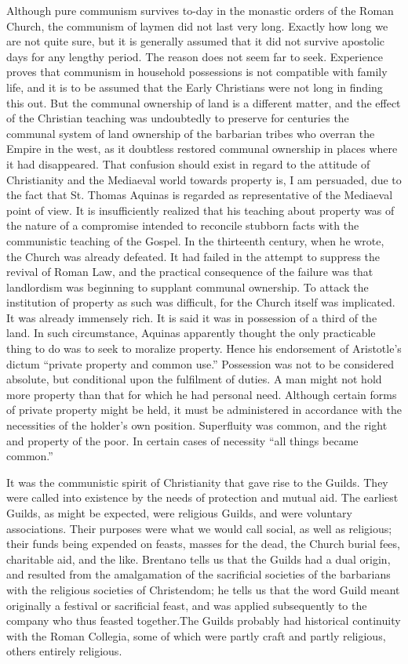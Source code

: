 \documentclass{book}
\begin{document}
Although pure communism survives to-day in the monastic orders of the Roman Church, the communism of laymen did not last very long. Exactly how long we are not quite sure, but it is generally assumed that it did not survive apostolic days for any lengthy period. The reason does not seem far to seek. Experience proves that communism in household possessions is not compatible with family life, and it is to be assumed that the Early Christians were not long in finding this out. But the communal ownership of land is a different matter, and the effect of the Christian teaching was undoubtedly to preserve for centuries the communal system of land ownership of the barbarian tribes who overran the Empire in the west, as it doubtless restored communal ownership in places where it had disappeared. That confusion should exist in regard to the attitude of Christianity and the Mediaeval world towards property is, I am persuaded, due to the fact that St. Thomas Aquinas is regarded as representative of the Mediaeval point of view. It is insufficiently realized that his teaching about property was of the nature of a compromise intended to reconcile stubborn facts with the communistic teaching of the Gospel. In the thirteenth century, when he wrote, the Church was already defeated. It had failed in the attempt to suppress the revival of Roman Law, and the practical consequence of the failure was that landlordism was beginning to supplant communal ownership. To attack the institution of property as such was difficult, for the Church itself was implicated. It was already immensely rich. It is said it was in possession of a third of the land. In such circumstance, Aquinas apparently thought the only practicable thing to do was to seek to moralize property. Hence his endorsement of Aristotle’s dictum “private property and common use.” Possession was not to be considered absolute, but conditional upon the fulfilment of duties. A man might not hold more property than that for which he had personal need. Although certain forms of private property might be held, it must be administered in accordance with the necessities of the holder’s own position. Superfluity was common, and the right and property of the poor. In certain cases of necessity “all things became common.”

It was the communistic spirit of Christianity that gave rise to the Guilds. They were called into existence by the needs of protection and mutual aid. The earliest Guilds, as might be expected, were religious Guilds, and were voluntary associations. Their purposes were what we would call social, as well as religious; their funds being expended on feasts, masses for the dead, the Church burial fees, charitable aid, and the like. Brentano tells us that the Guilds had a dual origin, and resulted from the amalgamation of the sacrificial societies of the barbarians with the religious societies of Christendom; he tells us that the word Guild meant originally a festival or sacrificial feast, and was applied subsequently to the company who thus feasted together.\footnotemark[2] The Guilds probably had historical continuity with the Roman Collegia, some of which were partly craft and partly religious, others entirely religious.
\end{document}
